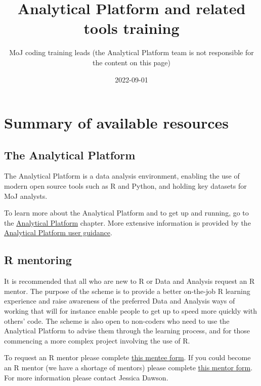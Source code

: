 \documentclass[
]{book}
\title{Analytical Platform and related tools training}
\author{MoJ coding training leads (the Analytical Platform team is not responsible for the content on this page)}
\date{2022-09-01}
\begin{document}
\maketitle

{
\setcounter{tocdepth}{1}
\tableofcontents
}
\hypertarget{summary}{%
\chapter{Summary of available resources}\label{summary}}

\hypertarget{the-analytical-platform}{%
\section{The Analytical Platform}\label{the-analytical-platform}}

The Analytical Platform is a data analysis environment, enabling the use of modern open source tools such as R and Python, and holding key datasets for MoJ analysts.

To learn more about the Analytical Platform and to get up and running, go to the \protect\hyperlink{AP}{Analytical Platform} chapter. More extensive information is provided by the \href{https://user-guidance.services.alpha.mojanalytics.xyz/\#content}{Analytical Platform user guidance}.

\hypertarget{r-mentoring}{%
\section{R mentoring}\label{r-mentoring}}

It is recommended that all who are new to R or Data and Analysis request an R mentor. The purpose of the scheme is to provide a better on-the-job R learning experience and raise awareness of the preferred Data and Analysis ways of working that will for instance enable people to get up to speed more quickly with others' code. The scheme is also open to non-coders who need to use the Analytical Platform to advise them through the learning process, and for those commencing a more complex project involving the use of R.

To request an R mentor please complete \href{https://forms.office.com/Pages/ResponsePage.aspx?id=KEeHxuZx_kGp4S6MNndq2PdkMZw8L-FEkMSL2t4Oet1UQVlWMUwzOVZRNUVKSTVZU0pPTUY0MDlZTSQlQCN0PWcu}{this mentee form}. If you could become an R mentor (we have a shortage of mentors) please complete \href{https://forms.office.com/Pages/ResponsePage.aspx?id=KEeHxuZx_kGp4S6MNndq2PdkMZw8L-FEkMSL2t4Oet1UNUw1N1M0NVNQSTNOVkdHOUtMQ1lMT0lHTSQlQCN0PWcu}{this mentor form}. For more information please contact Jessica Dawson.
\end{document}
